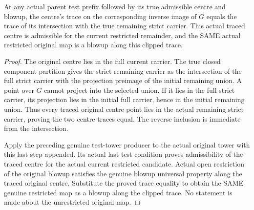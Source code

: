 \begin{theorem}
\label{hir:zero-contact-remainder-restricted-clipped-blowup}
\leanok
{}
At any actual parent test prefix followed by its true admissible centre and
blowup, the centre's trace on the corresponding inverse image of $G$ equals
the trace of its intersection with the true remaining strict carrier.
This actual traced centre is admissible for the current restricted remainder,
and the SAME actual restricted original map is a blowup along this clipped trace.
\end{theorem}
\begin{proof}
The original centre lies in the full current carrier. The true closed component
partition gives the strict remaining carrier as the intersection of the full
strict carrier with the projection preimage of the initial remaining union.
A point over $G$ cannot project into the selected union. If it lies in the
full strict carrier, its projection lies in the initial full carrier, hence
in the initial remaining union. Thus every traced original centre point
lies in the actual remaining strict carrier, proving the two centre traces
equal. The reverse inclusion is immediate from the intersection.

Apply the preceding genuine test-tower producer to the actual original tower
with this last step appended. Its actual last test condition proves
admissibility of the traced centre for the actual current restricted candidate.
Actual open restriction of the original blowup satisfies the genuine blowup
universal property along the traced original centre. Substitute the proved
trace equality to obtain the SAME genuine restricted map as a blowup along
the clipped trace. No statement is made about the unrestricted original map.
\end{proof}

